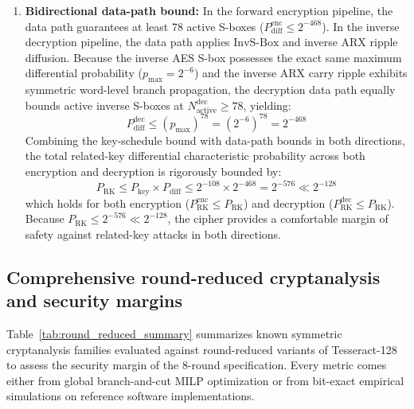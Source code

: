 \documentclass[10pt,twocolumn]{article}
\begin{document}
\begin{enumerate}
    \item \textbf{Bidirectional data-path bound:} In the forward encryption pipeline, the data path guarantees at least 78 active S-boxes ($P_{\text{diff}}^{\text{enc}} \le 2^{-468}$). In the inverse decryption pipeline, the data path applies $\text{InvS-Box}$ and inverse ARX ripple diffusion. Because the inverse AES S-box possesses the exact same maximum differential probability ($p_{\max} = 2^{-6}$) and the inverse ARX carry ripple exhibits symmetric word-level branch propagation, the decryption data path equally bounds active inverse S-boxes at $N_{\text{active}}^{\text{dec}} \ge 78$, yielding:
    \begin{equation}
        P_{\text{diff}}^{\text{dec}} \le (p_{\max})^{78} = (2^{-6})^{78} = 2^{-468}
    \end{equation}
    Combining the key-schedule bound with data-path bounds in both directions, the total related-key differential characteristic probability across both encryption and decryption is rigorously bounded by:
    \begin{equation}
        P_{\text{RK}} \le P_{\text{key}} \times P_{\text{diff}} \le 2^{-108} \times 2^{-468} = 2^{-576} \ll 2^{-128}
    \end{equation}
    which holds for both encryption ($P_{\text{RK}}^{\text{enc}} \le P_{\text{RK}}$) and decryption ($P_{\text{RK}}^{\text{dec}} \le P_{\text{RK}}$). Because $P_{\text{RK}} \le 2^{-576} \ll 2^{-128}$, the cipher provides a comfortable margin of safety against related-key attacks in both directions.
\end{enumerate}

\subsection{Comprehensive round-reduced cryptanalysis and security margins}
Table~\ref{tab:round_reduced_summary} summarizes known symmetric cryptanalysis families evaluated against round-reduced variants of Tesseract-128 to assess the security margin of the 8-round specification. Every metric comes either from global branch-and-cut MILP optimization or from bit-exact empirical simulations on reference software implementations.
\end{document}
